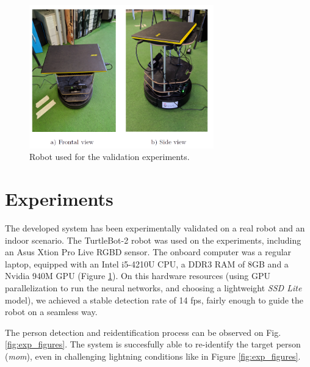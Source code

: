 \begin{figure}[h!]
	\centering
	\includegraphics[width=8cm]{images/exp_set}
	\caption{Robot used for the validation experiments.}
	\label{fig:exp_set}
\end{figure}


\section{Experiments}
\label{sec:experiments}

The developed system has been experimentally validated on a real robot and an indoor scenario. The TurtleBot-2 robot was used on the experiments, including an Asus Xtion Pro Live RGBD sensor. The onboard computer was a regular laptop, equipped with an Intel i5-4210U CPU, a DDR3 RAM of 8GB and a Nvidia 940M GPU (Figure \ref{fig:exp_set}). On this hardware resources (using GPU parallelization to run the neural networks, and choosing a lightweight \textit{SSD Lite }model), we achieved a stable detection rate of 14 fps, fairly enough to guide the robot on a seamless way. 



The person detection and reidentification process can be observed on Fig. \ref{fig:exp_figures}. The system is succesfully able to re-identify the target person (\textit{mom}), even in challenging lightning conditions like in Figure \ref{fig:exp_figures}.

